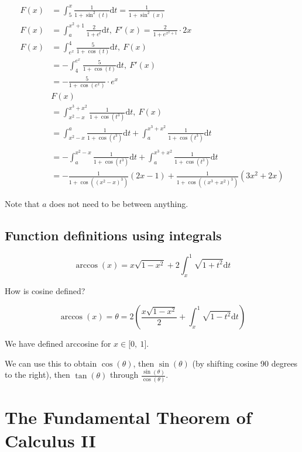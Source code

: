 \documentclass[12pt]{article}
\theoremstyle{plain}
\theoremstyle{remark}
\theoremstyle{definition}
\begin{document}
\begin{align*}
F(x) &= \int_{5}^{x}{\frac{1}{1 + \sin^{2}(t)}\text{d}t} = \frac{1}{1 + \sin^{2}(x)} \\
F(x) &= \int_{a}^{x^{2} + 1}{\frac{2}{1 + e^{t}}\text{d}t},\ F'(x) = \frac{2}{1 + e^{x^{2} + 1}} \cdot 2x \\
F(x) &= \int_{e^{x}}^{4}{\frac{5}{1 + \cos(t)}\text{d}t},\ F(x)  \\
&= - \int_{4}^{e^{x}}{\frac{5}{1 + \cos(t)}\text{d}t},\ F'(x)  \\
&= - \frac{5}{1 + \cos\left( e^{x} \right)} \cdot e^{x} \\
&F(x)  \\
&= \int_{x^{2} - x}^{x^{3} + x^{2}}{\frac{1}{1 + \cos\left( t^{3} \right)}\text{d}t},\ F(x)  \\
&= \int_{x^{2} - x}^{a}{\frac{1}{1 + \cos\left( t^{3} \right)}\text{d}t} + \int_{a}^{x^{3} + x^{2}}{\frac{1}{1 + \cos\left( t^{3} \right)}\text{d}t} \\
& \\
&= - \int_{a}^{x^{2} - x}{\frac{1}{1 + \cos\left( t^{3} \right)}\text{d}t} + \int_{a}^{x^{3} + x^{2}}{\frac{1}{1 + \cos\left( t^{3} \right)}\text{d}t}  \\
&= - \frac{1}{1 + \cos\left( \left( x^{2} - x \right)^{3} \right)}(2x - 1) + \frac{1}{1 + \cos\left( \left( x^{3} + x^{2} \right)^{3} \right)}\left( 3x^{2} + 2x \right)
\end{align*}


Note that \(a\) does not need to be between anything.


\subsection{Function definitions using
integrals}

\[\arccos(x) = x\sqrt{1 - x^{2}} + 2\int_{x}^{1}{\sqrt{1 + t^{2}}\text{d}t}\]

How is cosine defined?


\[\arccos(x) = \theta = 2\left( \frac{x\sqrt{1 - x^{2}}}{2} + \int_{x}^{1}{\sqrt{1 - t^{2}}\text{d}t} \right)\]

We have defined arccosine for \(x \in \lbrack 0,\ 1\rbrack\).

We can use this to obtain \(\cos(\theta)\), then \(\sin(\theta)\) (by
shifting cosine 90 degrees to the right), then \(\tan(\theta)\) through
\(\frac{\sin(\theta)}{\cos(\theta)}\).


\section{The Fundamental Theorem of Calculus
II}
\end{document}
